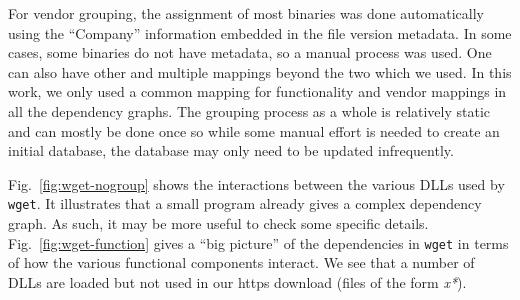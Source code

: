 For vendor grouping, the assignment of most binaries was done automatically
using the ``Company'' information embedded in the file version metadata.
In some cases, some binaries do not have metadata, so a manual process
was used.
One can also have other and multiple mappings beyond the two which we used.
In this work, we only used a
common mapping for functionality and vendor mappings
in all the dependency graphs.
The grouping process as a whole is relatively static and can mostly be
done once so while some manual effort is needed to create an initial
database, the database may only need to be updated infrequently.

Fig.~\ref{fig:wget-nogroup} shows the interactions
between the various DLLs used by {\tt wget}.
It illustrates that a small program already
gives a complex dependency graph.
As such, it may be more useful to check some specific details.
Fig.~\ref{fig:wget-function} gives
a ``big picture'' of the dependencies
in {\tt wget} in terms of how the various functional
components interact.
We see that a number of DLLs are loaded but not used in our https download
(files of the form {\it *x*}).


